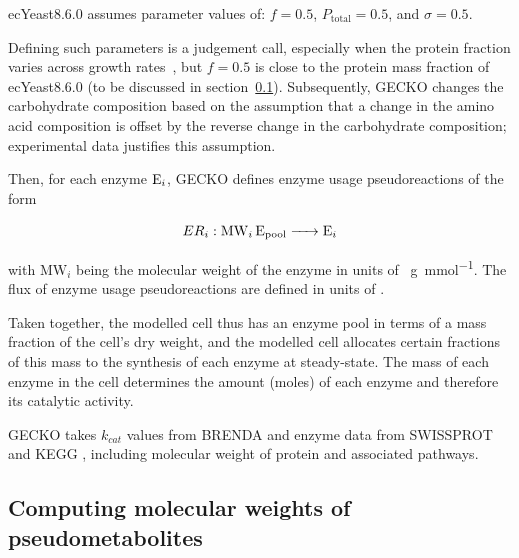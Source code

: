 ecYeast8.6.0 assumes parameter values of: $f = 0.5$, $P_{\mathrm{total}} = 0.5$, and $\sigma = 0.5$.

Defining such parameters is a judgement call, especially when the protein fraction varies across growth rates~\parencite{elsemmanWholecellModelingYeast2022}, but $f = 0.5$ is close to the protein mass fraction of ecYeast8.6.0 (to be discussed in section~\ref{subsec:model-yeast8-molweights}).
Subsequently, GECKO changes the carbohydrate composition based on the assumption that a change in the amino acid composition is offset by the reverse change in the carbohydrate composition;
experimental data justifies this assumption.

Then, for each enzyme $\ce{E_{i}}$, GECKO defines enzyme usage pseudoreactions of the form

\begin{equation}
  ER_{i}: \ce{ MW_{i} E_{\mathrm{pool}} -> E_{i} }
  \label{eq:model-gecko-enzyme-usage}
\end{equation}

with $\mathrm{MW}_{i}$ being the molecular weight of the enzyme in units of \SI{}{\gram~\milli\mole^{-1}}.
The flux of enzyme usage pseudoreactions are defined in units of \SI{}{\mmolgdw}.

Taken together, the modelled cell thus has an enzyme pool in terms of a mass fraction of the cell's dry weight, and the modelled cell allocates certain fractions of this mass to the synthesis of each enzyme at steady-state.  The mass of each enzyme in the cell determines the amount (moles) of each enzyme and therefore its catalytic activity.

GECKO takes $k_{cat}$ values from BRENDA \parencite{changBRENDAELIXIRCore2021} and enzyme data from SWISSPROT \parencite{theuniprotconsortiumUniProtUniversalProtein2023} and KEGG \parencite{kanehisaKEGGTaxonomybasedAnalysis2023}, including molecular weight of protein and associated pathways.

\subsection{Computing molecular weights of pseudometabolites}
\label{subsec:model-yeast8-molweights}

